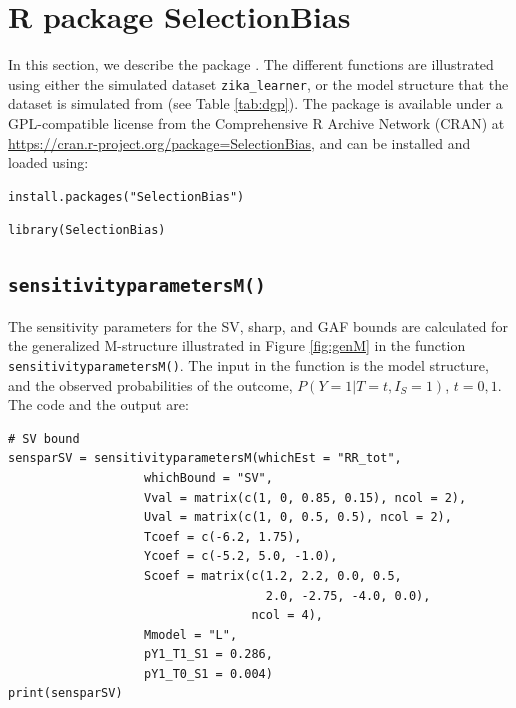 \section{R package SelectionBias}\label{r-package-selectionbias}

In this section, we describe the package . The different
functions are illustrated using either the simulated dataset \texttt{zika\_learner}, or
the model structure that the dataset is simulated from (see Table
\ref{tab:dgp}). The package  is available under a
GPL-compatible license from the Comprehensive R Archive Network (CRAN) at
\url{https://cran.r-project.org/package=SelectionBias}, and can be installed and
loaded using:

\begin{verbatim}
install.packages("SelectionBias")
\end{verbatim}

\begin{verbatim}
library(SelectionBias)
\end{verbatim}

\subsection{\texorpdfstring{\texttt{sensitivityparametersM()}}{sensitivityparametersM()}}\label{sensitivityparametersm}

The sensitivity parameters for the SV, sharp, and GAF bounds are calculated for
the generalized M-structure illustrated in Figure \ref{fig:genM} in the function
\texttt{sensitivityparametersM()}. The input in the function is the model
structure, and the observed probabilities of the outcome, \(P(Y=1|T=t,I_S=1)\),
\(t=0,1\). The code and the output are:

\begin{verbatim}
# SV bound
sensparSV = sensitivityparametersM(whichEst = "RR_tot",
                   whichBound = "SV",
                   Vval = matrix(c(1, 0, 0.85, 0.15), ncol = 2),
                   Uval = matrix(c(1, 0, 0.5, 0.5), ncol = 2),
                   Tcoef = c(-6.2, 1.75),
                   Ycoef = c(-5.2, 5.0, -1.0),
                   Scoef = matrix(c(1.2, 2.2, 0.0, 0.5,
                                    2.0, -2.75, -4.0, 0.0),
                                  ncol = 4),
                   Mmodel = "L",
                   pY1_T1_S1 = 0.286,
                   pY1_T0_S1 = 0.004)
print(sensparSV)
\end{verbatim}

